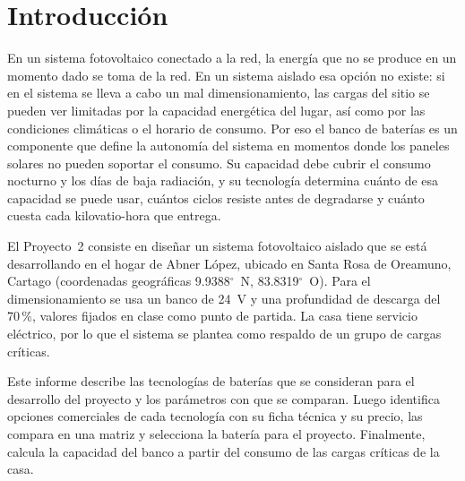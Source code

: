 \section{Introducción}

En un sistema fotovoltaico conectado a la red, la energía que no se produce en un momento dado se toma de la red. En un sistema aislado esa opción no existe: si en el sistema se lleva a cabo un mal dimensionamiento, las cargas del sitio se pueden ver limitadas por la capacidad energética del lugar, así como por las condiciones climáticas o el horario de consumo. Por eso el banco de baterías es un componente que define la autonomía del sistema en momentos donde los paneles solares no pueden soportar el consumo. Su capacidad debe cubrir el consumo nocturno y los días de baja radiación, y su tecnología determina cuánto de esa capacidad se puede usar, cuántos ciclos resiste antes de degradarse y cuánto cuesta cada kilovatio-hora que entrega.

El Proyecto~2 consiste en diseñar un sistema fotovoltaico aislado que se está desarrollando en el hogar de Abner López, ubicado en Santa Rosa de Oreamuno, Cartago (coordenadas geográficas 9.9388$^\circ$~N, 83.8319$^\circ$~O). Para el dimensionamiento se usa un banco de \SI{24}{V} y una profundidad de descarga del 70\,\%, valores fijados en clase como punto de partida. La casa tiene servicio eléctrico, por lo que el sistema se plantea como respaldo de un grupo de cargas críticas.

Este informe describe las tecnologías de baterías que se consideran para el desarrollo del proyecto y los parámetros con que se comparan. Luego identifica opciones comerciales de cada tecnología con su ficha técnica y su precio, las compara en una matriz y selecciona la batería para el proyecto. Finalmente, calcula la capacidad del banco a partir del consumo de las cargas críticas de la casa.
